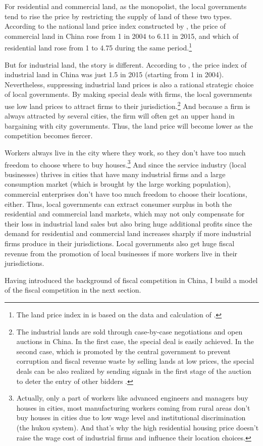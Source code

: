 For residential and commercial land, as the monopolist,
the local governments tend to rise the price by restricting the supply of land
of these two types. According to the national land price index constructed by
\cite{LiuXiong+2020+183+207},
the price of commercial land in China rose from 1 in 2004 to 6.11 in 2015,
and which of residential land rose from 1 to 4.75 during the same period.\footnote{
    The land price index in \cite{LiuXiong+2020+183+207}
    is based on the data
    and calculation of \cite{chen2017real}.}

But for industrial land, the story is different. According to \cite{LiuXiong+2020+183+207},
the price index of industrial land in China was just 1.5 in 2015 (starting from 1 in 2004).
Nevertheless, suppressing industrial land prices is also a rational strategic choice of
local governments. By making special deals with firms, the local governments use low
land prices to attract firms to their jurisdiction.\footnote{The industrial lands
    are sold through case-by-case negotiations and open auctions in China.
    In the first case, the special deal is easily achieved. In the second case,
    which is promoted by the central government to prevent corruption and fiscal revenue waste by
    selling lands at low prices, the special deals can be also realized by sending signals in
    the first stage of the auction to deter the entry of other bidders \citep{cai2013china}.}
And because a firm is
always attracted by several cities, the firm will often get an upper hand in bargaining
with city governments.
Thus, the land price will become lower as the competition becomes fiercer.

Workers always live in the city where they work,
so they don't have too much freedom to choose where to buy houses.\footnote{Actually,
    only a part of workers like advanced engineers and managers buy houses in cities,
    most manufacturing workers coming from rural areas don't buy houses in cities due to
    low wage level and institutional discrimination (the hukou system). And that's why
    the high residential housing price doesn't raise the wage cost of industrial firms and
    influence their location choices.}
And since the service industry (local businesses) thrives in cities
that have many industrial firms and a large consumption market
(which is brought by the large working population), commercial enterprises don't have
too much freedom to choose their locations, either.
Thus, local governments can extract
consumer surplus in both the residential and commercial land markets, which may
not only compensate for their loss in industrial land sales but also bring huge additional
profits since the demand for residential and commercial land
increases sharply if more industrial firms produce in their jurisdictions.
Local governments also get huge fiscal revenue from the promotion of local businesses if more workers live in their jurisdictions.

Having introduced the background of fiscal competition in China,
I build a model of the fiscal competition in the next section.

